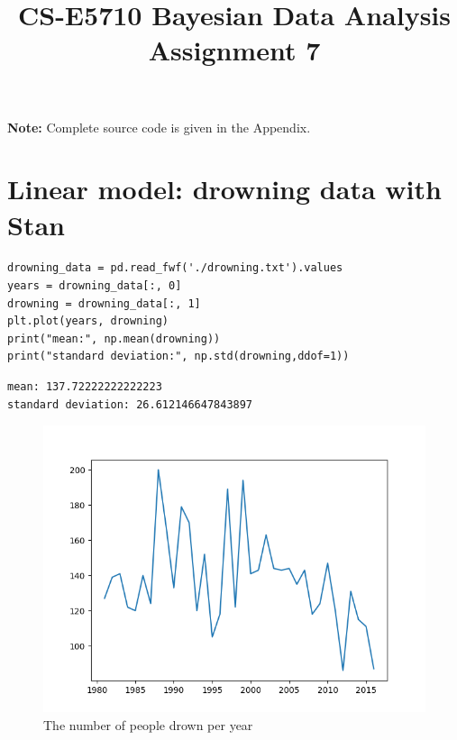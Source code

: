 \documentclass{article}
\begin{document}
\title{CS-E5710 Bayesian Data Analysis\\Assignment 7}                  
\maketitle



\textbf{Note: }Complete source code is given in the Appendix.

\section{Linear model: drowning data with Stan}

\begin{verbatim}  
drowning_data = pd.read_fwf('./drowning.txt').values
years = drowning_data[:, 0]
drowning = drowning_data[:, 1]
plt.plot(years, drowning)
print("mean:", np.mean(drowning))
print("standard deviation:", np.std(drowning,ddof=1))
\end{verbatim}

\begin{verbatim} 
mean: 137.72222222222223
standard deviation: 26.612146647843897 
\end{verbatim}

 
\begin{figure}[H]
\centering  
\includegraphics[scale=0.5]{trend.png}
\caption{The number of people drown per year}
\label{fig: label}
\end{figure}
\end{document}
